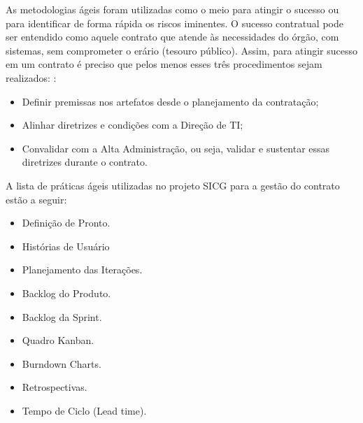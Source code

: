 As metodologias ágeis foram utilizadas como o meio para atingir o sucesso ou para identificar de forma rápida os riscos iminentes. O sucesso contratual pode ser entendido como aquele contrato que atende às necessidades do órgão, com sistemas, sem comprometer o erário (tesouro público). Assim, para atingir sucesso em um contrato é preciso que pelos menos esses três procedimentos sejam realizados: \cite{parente}:
\begin{itemize}
\item Definir premissas nos artefatos desde o planejamento da contratação;
\item Alinhar diretrizes e condições com a Direção de TI;
\item Convalidar com a Alta Administração, ou seja, validar e sustentar essas diretrizes durante o contrato.
\end{itemize}

A lista de práticas ágeis utilizadas no projeto SICG para a gestão do contrato estão a seguir:
\begin{itemize}
\item Definição de Pronto.
\item Histórias de Usuário
\item Planejamento das Iterações.
\item Backlog do Produto.
\item Backlog da Sprint.
\item Quadro Kanban.
\item Burndown Charts.
\item Retrospectivas.
\item Tempo de Ciclo (Lead time).
\end{itemize}

